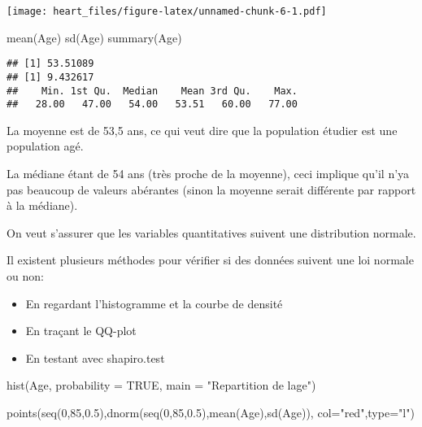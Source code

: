 \documentclass[
]{article}
\newenvironment{Shaded}{\begin{snugshade}}{\end{snugshade}}
\newcommand{\AttributeTok}[1]{\textcolor[rgb]{0.77,0.63,0.00}{#1}}
\newcommand{\ConstantTok}[1]{\textcolor[rgb]{0.00,0.00,0.00}{#1}}
\newcommand{\DecValTok}[1]{\textcolor[rgb]{0.00,0.00,0.81}{#1}}
\newcommand{\FloatTok}[1]{\textcolor[rgb]{0.00,0.00,0.81}{#1}}
\newcommand{\FunctionTok}[1]{\textcolor[rgb]{0.00,0.00,0.00}{#1}}
\newcommand{\NormalTok}[1]{#1}
\newcommand{\StringTok}[1]{\textcolor[rgb]{0.31,0.60,0.02}{#1}}
\providecommand{\tightlist}{%
  \setlength{\itemsep}{0pt}\setlength{\parskip}{0pt}}
\begin{document}
\texttt{[image: heart\_files/figure-latex/unnamed-chunk-6-1.pdf]}

\begin{Shaded}
\begin{Highlighting}[]
\FunctionTok{mean}\NormalTok{(Age)}
\FunctionTok{sd}\NormalTok{(Age)}
\FunctionTok{summary}\NormalTok{(Age)}
\end{Highlighting}
\end{Shaded}

\begin{verbatim}
## [1] 53.51089
## [1] 9.432617
##    Min. 1st Qu.  Median    Mean 3rd Qu.    Max. 
##   28.00   47.00   54.00   53.51   60.00   77.00
\end{verbatim}

La moyenne est de 53,5 ans, ce qui veut dire que la population étudier
est une population agé.

La médiane étant de 54 ans (très proche de la moyenne), ceci implique
qu'il n'ya pas beaucoup de valeurs abérantes (sinon la moyenne serait
différente par rapport à la médiane).

On veut s'assurer que les variables quantitatives suivent une
distribution normale.

Il existent plusieurs méthodes pour vérifier si des données suivent une
loi normale ou non:

\begin{itemize}
\tightlist
\item
  En regardant l'histogramme et la courbe de densité
\item
  En traçant le QQ-plot
\item
  En testant avec shapiro.test
\end{itemize}

\begin{Shaded}
\begin{Highlighting}[]
\FunctionTok{hist}\NormalTok{(Age, }\AttributeTok{probability =} \ConstantTok{TRUE}\NormalTok{, }\AttributeTok{main =} \StringTok{"Repartition de l\textquotesingle{}age"}\NormalTok{)}

\FunctionTok{points}\NormalTok{(}\FunctionTok{seq}\NormalTok{(}\DecValTok{0}\NormalTok{,}\DecValTok{85}\NormalTok{,}\FloatTok{0.5}\NormalTok{),}\FunctionTok{dnorm}\NormalTok{(}\FunctionTok{seq}\NormalTok{(}\DecValTok{0}\NormalTok{,}\DecValTok{85}\NormalTok{,}\FloatTok{0.5}\NormalTok{),}\FunctionTok{mean}\NormalTok{(Age),}\FunctionTok{sd}\NormalTok{(Age)), }\AttributeTok{col=}\StringTok{"red"}\NormalTok{,}\AttributeTok{type=}\StringTok{"l"}\NormalTok{)}
\end{Highlighting}
\end{Shaded}
\end{document}
